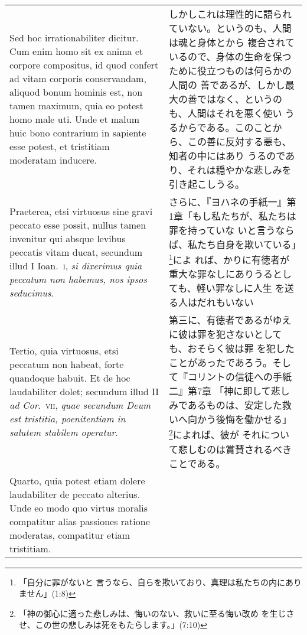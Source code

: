 \documentclass[10pt]{jsarticle}
\begin{document}
\begin{longtable}{p{21em}p{21em}}
 Sed hoc irrationabiliter dicitur. Cum enim homo sit ex anima et
 corpore compositus, id quod confert ad vitam corporis conservandam,
 aliquod bonum hominis est, non tamen maximum, quia eo potest homo
 male uti. Unde et malum huic bono contrarium in sapiente esse potest,
 et tristitiam moderatam inducere.

&

 しかしこれは理性的に語られていない。というのも、人間は魂と身体とから
 複合されているので、身体の生命を保つために役立つものは何らかの人間の
 善であるが、しかし最大の善ではなく、というのも、人間はそれを悪く使い
 うるからである。このことから、この善に反対する悪も、知者の中にはあり
 うるのであり、それは穏やかな悲しみを引き起こしうる。

\\


 Praeterea, etsi virtuosus sine gravi peccato esse possit, nullus
 tamen invenitur qui absque levibus peccatis vitam ducat, secundum
 illud I Ioan.~{\scshape i}, {\itshape si dixerimus quia peccatum non habemus, nos ipsos
 seducimus}.


&

 さらに、『ヨハネの手紙一』第1章「もし私たちが、私たちは罪を持っていな
 いと言うならば、私たち自身を欺いている」\footnote{「自分に罪がないと
 言うなら、自らを欺いており、真理は私たちの内にありません」(1:8)}によ
 れば、かりに有徳者が重大な罪なしにありうるとしても、軽い罪なしに人生
 を送る人はだれもいない

\\

 Tertio, quia virtuosus, etsi peccatum non habeat, forte quandoque
 habuit. Et de hoc laudabiliter dolet; secundum illud II {\itshape ad
 Cor}.~{\scshape vii}, {\itshape quae secundum Deum est tristitia,
 poenitentiam in salutem stabilem operatur}.


&

 第三に、有徳者であるがゆえに彼は罪を犯さないとしても、おそらく彼は罪
 を犯したことがあったであろう。そして『コリントの信徒への手紙二』第7章
 「神に即して悲しみであるものは、安定した救いへ向かう後悔を働かせる」
 \footnote{「神の御心に適った悲しみは、悔いのない、救いに至る悔い改め
 を生じさせ、この世の悲しみは死をもたらします。」(7:10)}によれば、彼が
 それについて悲しむのは賞賛されるべきことである。

\\


 Quarto, quia potest etiam dolere laudabiliter de peccato
 alterius. Unde eo modo quo virtus moralis compatitur alias passiones
 ratione moderatas, compatitur etiam tristitiam.


\end{longtable}
\end{document}
